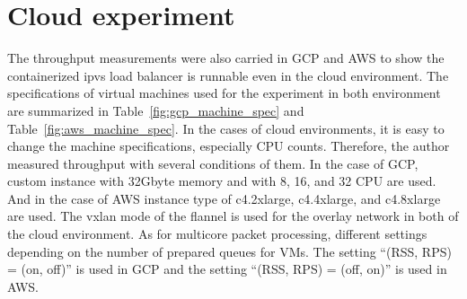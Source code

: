

\FloatBarrier

\section{Cloud experiment}

The throughput measurements were also carried in GCP and AWS to show the containerized ipvs load balancer is runnable even in the cloud environment.
The specifications of virtual machines used for the experiment in both environment are summarized in Table~\ref{fig:gcp_machine_spec} and Table~\ref{fig:aws_machine_spec}.
In the cases of cloud environments, it is easy to change the machine specifications, especially CPU counts.
Therefore, the author measured throughput with several conditions of them.
In the case of GCP, custom instance with 32Gbyte memory and with 8, 16, and 32 CPU are used.
And in the case of AWS instance type of c4.2xlarge, c4.4xlarge, and c4.8xlarge are used.
The vxlan mode of the flannel is used for the overlay network in both of the cloud environment.
As for multicore packet processing, different settings depending on the number of prepared queues for VMs. 
The setting \enquote{(RSS, RPS) = (on, off)} is used in GCP and the setting \enquote{(RSS, RPS) = (off, on)} is used in AWS.

